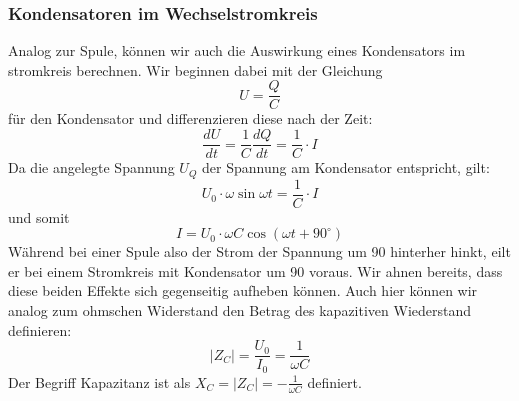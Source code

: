 \subsubsection{Kondensatoren im Wechselstromkreis}
Analog zur Spule, können wir auch die Auswirkung eines Kondensators im stromkreis berechnen. %
Wir beginnen dabei mit der Gleichung
\begin{equation}
U = \frac{Q}{C}
\end{equation}
für den Kondensator und differenzieren diese nach der Zeit:
\begin{equation}
\frac{dU}{dt} = \frac{1}{C}\frac{dQ}{dt} = \frac{1}{C} \cdot I
\end{equation}
Da die angelegte Spannung $U_Q$ der Spannung am Kondensator entspricht, gilt:
\begin{equation}
U_0\cdot \omega \sin \omega t = \frac{1}{C} \cdot I
\end{equation}
und somit
\begin{equation}
I = U_0\cdot \omega C \cos\left( \omega t + 90^\circ\right)
\end{equation}
Während bei einer Spule also der Strom der Spannung um \unit{90}{\degree} hinterher hinkt, eilt er bei einem Stromkreis mit Kondensator um \unit{90}{\degree} voraus. Wir ahnen bereits, dass diese beiden Effekte sich gegenseitig aufheben können.
Auch hier können wir analog zum ohmschen Widerstand den Betrag des kapazitiven Wiederstand definieren:
\begin{equation}
\left|Z_C\right| = \frac{U_0}{I_0} = \frac{1}{\omega C}
\end{equation}
Der Begriff Kapazitanz ist als $X_C = \left|Z_C\right| = -\frac{1}{\omega C}$ definiert.

